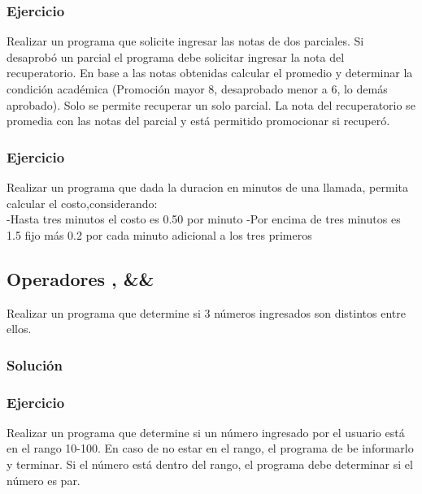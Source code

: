 \subsubsection{Ejercicio}
Realizar un programa que solicite ingresar las notas de dos parciales. Si desaprobó un parcial el programa debe solicitar ingresar la nota del recuperatorio. En base a las notas obtenidas calcular el promedio y determinar la condición académica (Promoción mayor 8, desaprobado menor a 6, lo demás aprobado). Solo se permite recuperar un solo parcial. La nota del recuperatorio se promedia con las notas del parcial y está permitido promocionar si recuperó.
{\small
  \lstset{inputencoding=utf8/latin1}
  
}

\subsubsection{Ejercicio}
Realizar un programa que dada la duracion en minutos de una llamada, permita calcular el costo,considerando:\\
-Hasta tres minutos el costo es 0.50 por minuto
-Por encima de tres minutos es 1.5 fijo más 0.2 por cada minuto adicional a los tres primeros
{\small
  \lstset{inputencoding=utf8/latin1}
  
}

\subsection*{Operadores \textbar\textbar, \&\&}
Realizar un programa que determine si 3 números ingresados son distintos entre ellos.
\subsubsection{Solución}

\lstset{inputencoding=utf8/latin1}

{\small
  \lstset{inputencoding=utf8/latin1}
}

\subsubsection{Ejercicio}
Realizar un programa que determine si un número ingresado por el usuario está en el rango 10-100. En caso de no estar en el rango, el programa de be informarlo y terminar. Si el número está dentro del rango, el programa debe determinar si el número es par.
{\small
  \lstset{inputencoding=utf8/latin1}
  
}

